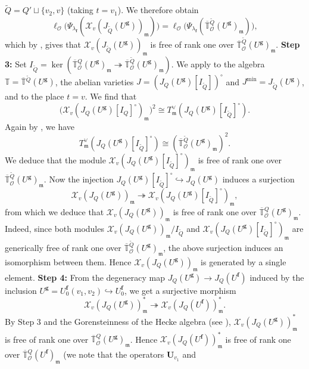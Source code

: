 \documentclass[a4paper, notitlepage, 10pt]{amsart}
\theoremstyle{plain} %
\theoremstyle{definition} %
\theoremstyle{remark} %
\numberwithin{equation}{section}
\newcommand{\bbT}{\mathbb T}
\begin{document}
$\widetilde{Q}=Q'\sqcup \{v_2,v\}$ (taking $t=v_1$). We therefore obtain   $$ \ell_{\mathcal{O}}\big(\Psi_{\lambda_{\mathbf{f}}}(\mathcal{X}_v(J_{\widetilde{Q}}(U^{\mathbf{g}}))_{\mathfrak{m}})\big)=\ell_{\mathcal{O}}\big(\Psi_{\lambda_{\mathbf{f}}}(\overline{\bbT}{}^{\widetilde{Q}}_{\mathcal{O}}(U^{\mathbf{g}})_{\mathfrak{m}})\big),   $$    which by , gives that $\mathcal{X}_v(J_{\widetilde{Q}}(U^{\mathbf{g}}))_{\mathfrak{m}}$ is free of rank one over $\overline{\bbT}{}^{\widetilde{Q}}_{\mathcal{O}}(U^{\mathbf{g}})_{\mathfrak{m}}$. \textbf{Step 3:} Set $I_{\widetilde{Q}}=\ker(\overline{\bbT}{}^{Q}_{\mathcal{O}}(U^{\mathbf{g}})_{\mathfrak{m}}\twoheadrightarrow \overline{\bbT}{}^{\widetilde{Q}}_{\mathcal{O}}(U^{\mathbf{g}})_{\mathfrak{m}})$. We apply  to the algebra $\bbT=\overline{\bbT}{}^{\widetilde{Q}}(U^{\mathbf{g}})$, the abelian varieties $J=(J_Q(U^{\mathbf{g}})[I_{\widetilde{Q}}])^{\circ}$ and $J^{\min}= J_{\widetilde{Q}}(U^{\mathbf{g}})$, and to the place $t=v$. We find that   $$\big(\mathcal{X}_v(J_Q(U^{\mathbf{g}})[I_Q]^{\circ})_{\mathfrak{m}}\big)^2\cong T^\vee_{\mathfrak{m}}(J_Q(U^{\mathbf{g}})[I_{\widetilde{Q}}]^{\circ}).$$  Again by \cite[Corollary 2.5]{Em03}, we have $$T^\vee_{\mathfrak{m}}(J_Q(U^{\mathbf{g}})[I_{\widetilde{Q}}]^{\circ})\cong (\overline{\bbT}{}^{\widetilde{Q}}_{\mathcal{O}}(U^{\mathbf{g}})_{\mathfrak{m}})^2.$$ We deduce that the module $\mathcal{X}_v(J_Q(U^{\mathbf{g}})[I_{\widetilde{Q}}]^{\circ})_{\mathfrak{m}}$ is free of rank one over $\overline{\bbT}{}^{\widetilde{Q}}_{\mathcal{O}}(U^{\mathbf{g}})_{\mathfrak{m}}$. Now the injection $J_Q(U^{\mathbf{g}})[I_{\widetilde{Q}}]^{\circ}\hookrightarrow J_Q(U^{\mathbf{g}})$ induces a surjection $$ \mathcal{X}_v(J_Q(U^{\mathbf{g}}))_{\mathfrak{m}}\twoheadrightarrow \mathcal{X}_v(J_Q(U^{\mathbf{g}})[I_{\widetilde{Q}}]^{\circ})_{\mathfrak{m}}, $$ from which we deduce that $\mathcal{X}_v(J_Q(U^{\mathbf{g}}))_{\mathfrak{m}}$ is free of rank one over $\overline{\bbT}{}^{Q}_{\mathcal{O}}(U^{\mathbf{g}})_{\mathfrak{m}}$. Indeed, since both modules $\mathcal{X}_v(J_Q(U^{\mathbf{g}}))_{\mathfrak{m}}/I_{\widetilde{Q}}$ and $\mathcal{X}_v(J_Q(U^{\mathbf{g}})[I_{\widetilde{Q}}]^{\circ})_{\mathfrak{m}}$ are generically free of rank one over $\overline{\bbT}{}^{\widetilde{ Q}}_{\mathcal{O}}(U^{\mathbf{g}})_{\mathfrak{m}}$, the above surjection induces an isomorphism between them. Hence $\mathcal{X}_v(J_Q(U^{\mathbf{g}}))_{\mathfrak{m}}$ is generated by a single element. \textbf{Step 4:} From the degeneracy map $J_{Q}(U^{\mathbf{g}})\to J_{Q}(U^{\mathbf{f}})$ induced by the inclusion $ U^{\mathbf{g}}=U^{\mathbf{f}}_0(v_1,v_2)\hookrightarrow U^{\mathbf{f}}_0$, we get a surjective morphism $$\mathcal{X}_{v}(J_{Q}(U^{\mathbf{g}}))_{\mathfrak{m}}^* \twoheadrightarrow \mathcal{X}_{v}(J_{Q}(U^{\mathbf{f}}))_{\mathfrak{m}}^*. $$ By Step 3 and the Gorensteinness of the Hecke algebra (see ), $\mathcal{X}_{v}(J_{Q}(U^{\mathbf{g}}))_{\mathfrak{m}}^* $ is free of rank one over $\overline{\bbT}{}^{Q}_{\mathcal{O}}(U^{\mathbf{g}})_{\mathfrak{m}}$. Hence $\mathcal{X}_{v}(J_{Q}(U^{\mathbf{f}}))_{\mathfrak{m}}^*$ is free of rank one over $\overline{\bbT}{}^{Q}_{\mathcal{O}}(U^{\mathbf{f}})_{\mathfrak{m}}$ (we note that the operators $\mathbf{U}_{v_1}$ and 
\end{document}
